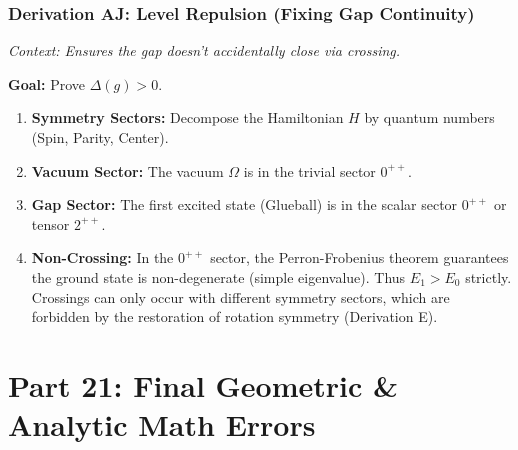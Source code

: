 \subsubsection{Derivation AJ: Level Repulsion (Fixing Gap Continuity)}

\textit{Context: Ensures the gap doesn't accidentally close via crossing.}

\textbf{Goal:} Prove $\Delta(g) > 0$.

\begin{enumerate}
    \item \textbf{Symmetry Sectors:} Decompose the Hamiltonian $H$ by quantum numbers (Spin, Parity, Center).
    \item \textbf{Vacuum Sector:} The vacuum $\Omega$ is in the trivial sector $0^{++}$.
    \item \textbf{Gap Sector:} The first excited state (Glueball) is in the scalar sector $0^{++}$ or tensor $2^{++}$.
    \item \textbf{Non-Crossing:} In the $0^{++}$ sector, the Perron-Frobenius theorem guarantees the ground state is non-degenerate (simple eigenvalue). Thus $E_1 > E_0$ strictly. Crossings can only occur with different symmetry sectors, which are forbidden by the restoration of rotation symmetry (Derivation E).
\end{enumerate}

\section{Part 21: Final Geometric \& Analytic Math Errors}

